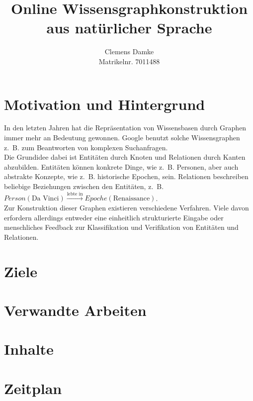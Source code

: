 \documentclass[11pt, a4paper]{scrreprt}
\begin{document}
\frontmatter
\titlehead{Entwurf 1}
\subject{Bachelorarbeit Proposal}
\title{
	Online Wissensgraphkonstruktion\\
	aus natürlicher Sprache
}
\author{
	Clemens Damke\\[1ex]
	Matrikelnr. 7011488
}
\publishers{
	{\normalsize betreut von}\\[2ex]
	Prof.~Dr.~Eyke Hüllermeier\\
	Intelligente Systeme\\
	Institut für Informatik\\
	Universität Paderborn
}
\maketitle

\section{Motivation und Hintergrund}

In den letzten Jahren hat die Repräsentation von Wissensbasen durch Graphen immer mehr an Bedeutung gewonnen.
Google benutzt solche Wissensgraphen z.~B. zum Beantworten von komplexen Suchanfragen.\\

Die Grundidee dabei ist Entitäten durch Knoten und Relationen durch Kanten abzubilden.
Entitäten können konkrete Dinge, wie z.~B. Personen, aber auch abstrakte Konzepte, wie z.~B. historische Epochen, sein.
Relationen beschreiben beliebige Beziehungen zwischen den Entitäten, z.~B. $Person(\text{Da Vinci}) \xrightarrow{\text{lebte in}} Epoche(\text{Renaissance})$.\\

Zur Konstruktion dieser Graphen existieren verschiedene Verfahren.
Viele davon erfordern allerdings entweder eine einheitlich strukturierte Eingabe oder menschliches Feedback zur Klassifikation und Verifikation von Entitäten und Relationen.

\section{Ziele}

\section{Verwandte Arbeiten}

\section{Inhalte}

\section{Zeitplan}
\end{document}
